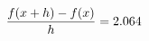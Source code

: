 \documentclass[preview]{standalone}
\begin{document}
\begin{align*}
\special{dvisvgm:raw <g id='unique000'>}\frac{f(x+h)-f(x)}{h} = 2.064\special{dvisvgm:raw </g>}
\end{align*}
\end{document}
